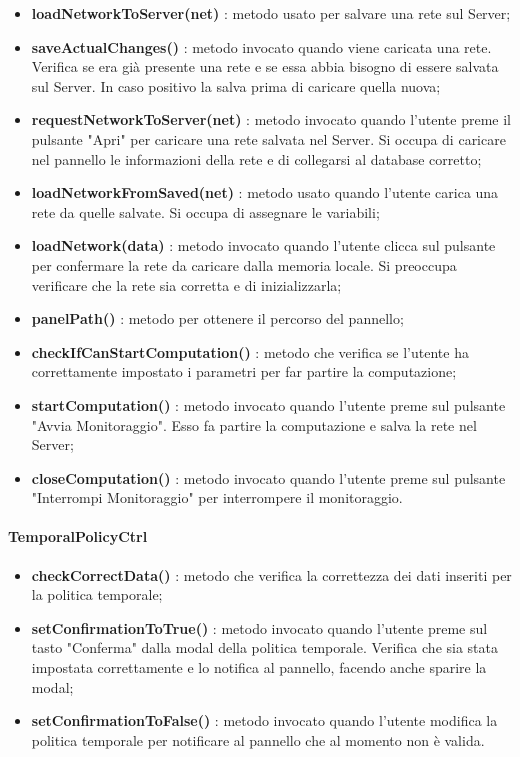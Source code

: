 \begin{itemize}
			\item \textbf{loadNetworkToServer(net)} : metodo usato per salvare una rete sul Server;
			\item \textbf{saveActualChanges()} : metodo invocato quando viene caricata una rete. Verifica se era già presente una rete e se essa abbia bisogno di essere salvata sul Server. In caso positivo la salva prima di caricare quella nuova;
			\item \textbf{requestNetworkToServer(net)} : metodo invocato quando l'utente preme il pulsante "Apri" per caricare una rete salvata nel Server. Si occupa di caricare nel pannello le informazioni della rete e di collegarsi al database corretto;
			\item \textbf{loadNetworkFromSaved(net)} : metodo usato quando l'utente carica una rete da quelle salvate. Si occupa di assegnare le variabili;
			\item \textbf{loadNetwork(data)} : metodo invocato quando l'utente clicca sul pulsante per confermare la rete da caricare dalla memoria locale. Si preoccupa verificare che la rete sia corretta e di inizializzarla;
			\item \textbf{panelPath()} : metodo per ottenere il percorso del pannello;
			\item \textbf{checkIfCanStartComputation()} : metodo che verifica se l'utente ha correttamente impostato i parametri per far partire la computazione;
			\item \textbf{startComputation()} : metodo invocato quando l'utente preme sul pulsante "Avvia Monitoraggio". Esso fa partire la computazione e salva la rete nel Server;
			\item \textbf{closeComputation()} : metodo invocato quando l'utente preme sul pulsante "Interrompi Monitoraggio" per interrompere il monitoraggio.
	\end{itemize}
	  \paragraph{TemporalPolicyCtrl} 
			\begin{itemize}
				\item	\textbf{checkCorrectData()} : metodo che verifica la correttezza dei dati inseriti per la politica temporale;
				\item \textbf{setConfirmationToTrue()} : metodo invocato quando l'utente preme sul tasto "Conferma" dalla modal della politica temporale. Verifica che sia stata impostata correttamente e lo notifica al pannello, facendo anche sparire la modal;
				\item \textbf{setConfirmationToFalse()} : metodo invocato quando l'utente modifica la politica temporale  per notificare al pannello che al momento non è valida.
	\end{itemize}
